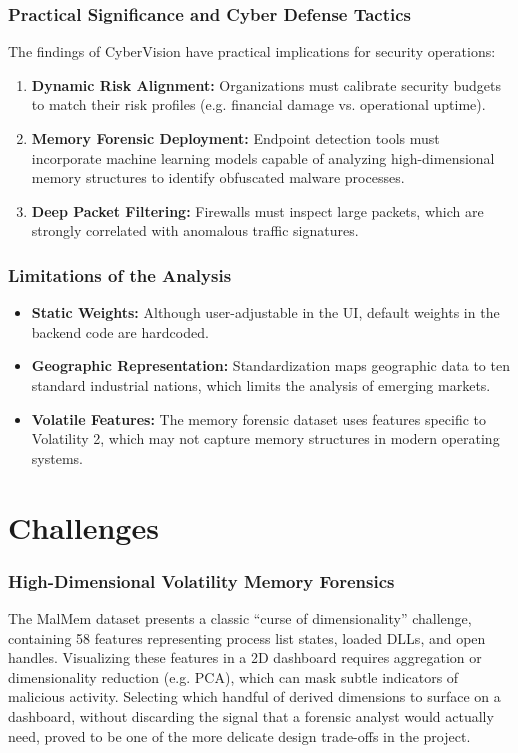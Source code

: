\documentclass[a4paper, 12pt]{report}
\begin{document}
\subsection{Practical Significance and Cyber Defense Tactics}
The findings of CyberVision have practical implications for security operations:
\begin{enumerate}
    \item \textbf{Dynamic Risk Alignment:} Organizations must calibrate security budgets to match their risk profiles (e.g. financial damage vs. operational uptime).
    \item \textbf{Memory Forensic Deployment:} Endpoint detection tools must incorporate machine learning models capable of analyzing high-dimensional memory structures to identify obfuscated malware processes.
    \item \textbf{Deep Packet Filtering:} Firewalls must inspect large packets, which are strongly correlated with anomalous traffic signatures.
\end{enumerate}

\subsection{Limitations of the Analysis}
\begin{itemize}
    \item \textbf{Static Weights:} Although user-adjustable in the UI, default weights in the backend code are hardcoded.
    \item \textbf{Geographic Representation:} Standardization maps geographic data to ten standard industrial nations, which limits the analysis of emerging markets.
    \item \textbf{Volatile Features:} The memory forensic dataset uses features specific to Volatility 2, which may not capture memory structures in modern operating systems.
\end{itemize}

\chapter{Challenges}

\subsection{High-Dimensional Volatility Memory Forensics}
The MalMem dataset presents a classic ``curse of dimensionality'' challenge, containing 58 features representing process list states, loaded DLLs, and open handles. Visualizing these features in a 2D dashboard requires aggregation or dimensionality reduction (e.g. PCA), which can mask subtle indicators of malicious activity. Selecting which handful of derived dimensions to surface on a dashboard, without discarding the signal that a forensic analyst would actually need, proved to be one of the more delicate design trade-offs in the project.
\end{document}
